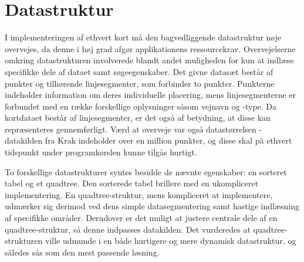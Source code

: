 \section{Datastruktur}
\label{sec:datastruktur}
I implementeringen af ethvert kort må den bagvedliggende datastruktur nøje overvejes, da denne i høj grad afgør applikationens ressourcekrav. Overvejelserne omkring datastrukturen involverede blandt andet muligheden for kun at indlæse specifikke dele af dataet samt søgeegenskaber. Det givne datasæt består af punkter og tilhørende linjesegmenter, som forbinder to punkter. Punkterne indeholder information om deres individuelle placering, mens linjesegmenterne er forbundet med en række forskellige oplysninger såsom vejnavn og -type. Da kortdataet består af linjesegmenter, er det også af betydning, at disse kan repræsenteres gennemførligt. Værd at overveje var også datastørrelsen - datakilden fra Krak indeholder over en million punkter, og disse skal på ethvert tidspunkt under programkørslen kunne tilgås hurtigt.

To forskellige datastrukturer syntes besidde de nævnte egenskaber: en sorteret tabel og et quadtree. Den sorterede tabel brillere med en ukompliceret implementering. En quadtree-struktur, mens kompliceret at implementere, udmærker sig derimod ved dens simple datasegmentering samt hastige indlæsning af specifikke områder. Derudover er det muligt at justere centrale dele af en quadtree-struktur, så denne indpasses datakilden. Det vurderedes at quadtree-strukturen ville udmunde i en både hurtigere og mere dynamisk datastruktur, og således sås som den mest passende løsning.
